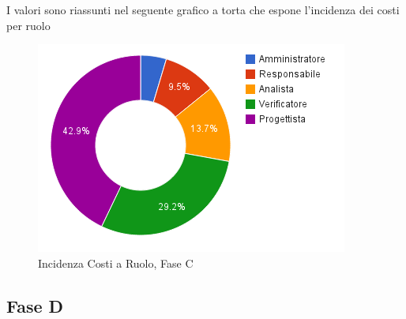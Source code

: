 I valori sono riassunti nel seguente grafico a torta che espone l'incidenza dei costi per ruolo
\begin{figure}[h]
	\centering
	\includegraphics[width=0.8\linewidth]{./content/Immagini/prospetti/costiPrAr.png}
	\caption{Incidenza Costi a Ruolo, Fase C}
\end{figure}
\pagebreak
\subsection{Fase D}
\label{ProgettazioneDettaglioLav}
